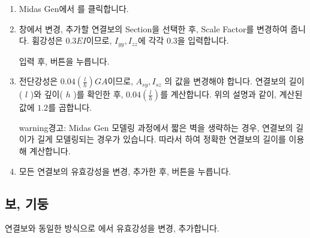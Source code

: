 \documentclass[a4paper,11pt,korean,openany,oneside]{sphinxmanual}
\begin{document}
\begin{sphinxShadowBox}
\begin{enumerate}
%
\item {} 
\sphinxAtStartPar
Midas Gen에서  \sphinxhyphen{}  \sphinxhyphen{} 를 클릭합니다.

\item {} 
\sphinxAtStartPar
{} 창에서 변경, 추가할 연결보의 Section을 선택한 후, Scale Factor를 변경하여 줍니다.
휨강성은 \(0.3EI\)이므로, \(I_{yy}, I_{zz}\)에 각각 \(0.3\)을 입력합니다.


\sphinxAtStartPar
입력 후,  버튼을 누릅니다.

\item {} 
\sphinxAtStartPar
전단강성은 \(0.04(\frac{l}{h})GA\)이므로, \(A_{sy}, I_{sz}\) 의 값을 변경해야 합니다.
연결보의 길이( \(l\) )와 깊이( \(h\) )를 확인한 후, \(0.04(\frac{l}{h})\)를 계산합니다.
위의 설명과 같이, 계산된 값에 \(1.2\)를 곱합니다.

\begin{center}
\noindent{}
\end{center}

\begin{sphinxadmonition}{warning}{경고:}
\sphinxAtStartPar
Midas Gen 모델링 과정에서 짧은 벽을 생략하는 경우, 연결보의 길이가 길게 모델링되는 경우가 있습니다.
따라서  하여 정확한 연결보의 길이를 이용해 계산합니다.
\end{sphinxadmonition}

\item {} 
\sphinxAtStartPar
모든 연결보의 유효강성을 변경, 추가한 후,  버튼을 누릅니다.

\end{enumerate}
\end{sphinxShadowBox}


\subsection{보, 기둥}
\label{\detokenize{1_stiffness_setting:id4}}
\sphinxAtStartPar
연결보와 동일한 방식으로 에서 유효강성을 변경, 추가합니다.
\end{document}
